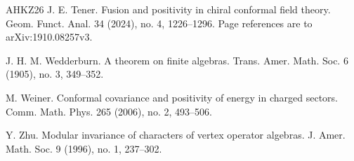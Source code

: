 \documentclass[leqno]{article}
\numberwithin{equation}{section}
\begin{document}
\begin{thebibliography}{AHKZ26}
J. E. Tener.
\newblock Fusion and positivity in chiral conformal field theory.
\newblock Geom. Funct. Anal. 34 (2024), no. 4, 1226--1296. Page references are to arXiv:1910.08257v3.

J. H. M. Wedderburn.
\newblock A theorem on finite algebras.
\newblock Trans. Amer. Math. Soc. 6 (1905), no. 3, 349--352.

M. Weiner.
\newblock Conformal covariance and positivity of energy in charged sectors.
\newblock Comm. Math. Phys. 265 (2006), no. 2, 493--506.

Y. Zhu.
\newblock Modular invariance of characters of vertex operator algebras.
\newblock J. Amer. Math. Soc. 9 (1996), no. 1, 237--302.

\end{thebibliography}
\end{document}
